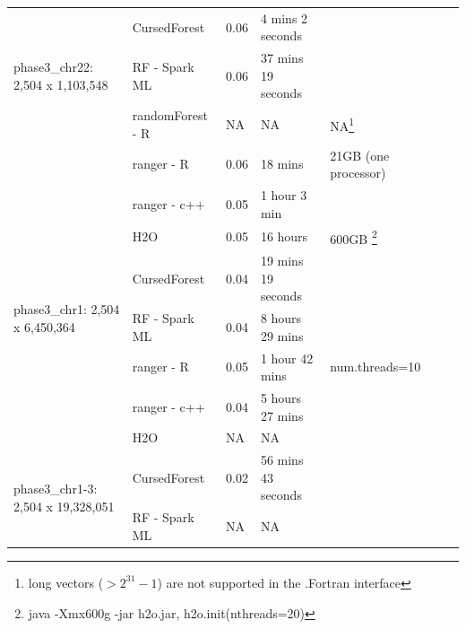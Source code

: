 \documentclass[11pt]{article}
\newcommand{\cursedforest}{{\sc CursedForest}}
\begin{document}
\begin{table}
\begin{minipage}{\textwidth}
\begin{tabular}{|l|l|l|l|l|l|p{1cm}|}
 \hline
\multirow{3}{*}{phase3\_chr22: 2,504 x 1,103,548}   & \cursedforest & 0.06 & 4 mins 2 seconds & \\  %
						  & RF - Spark ML   & 0.06 & 37 mins 19 seconds  & \\  %
                                                    & randomForest - R        & NA         & NA               & NA\footnote{long vectors ($> 2^31-1$)  are not supported in the .Fortran interface} \\ %
                                                    & ranger - R    & 0.06       & 18 mins        & 21GB (one processor) \\ %
                                                    & ranger - c++ & 0.05  & 1 hour 3 min &   \\  %
			                           & H2O           & 0.05       & 16 hours         & 600GB \footnote{java -Xmx600g -jar h2o.jar,   h2o.init(nthreads=20)} \\  %
\hline
\multirow{3}{*}{phase3\_chr1: 2,504 x 6,450,364}    & \cursedforest & 0.04  & 19 mins 19 seconds &        \\ %
                                                    & RF - Spark ML  &  0.04       & 8 hours 29 mins   &     \\ %
                                                   & ranger - R      & 0.05       & 1 hour 42 mins          & num.threads=10  \\ %
                                                   & ranger - c++ & 0.04 & 5 hours 27 mins &  \\ %
                                                    &H2O & NA & NA &   \\
\hline
\multirow{3}{*}{phase3\_chr1-3: 2,504 x 19,328,051} & \cursedforest & 0.02  & 56 mins 43 seconds     &        \\ %
                                                    & RF - Spark ML  &  NA           &  NA                                                     & \\ %

\end{tabular}
\end{minipage}
\end{table}
\end{document}
